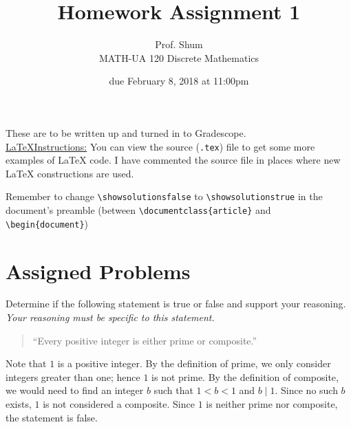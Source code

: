 \documentclass{article}
\title{Homework Assignment 1}
\author{%
    Prof. Shum
\\  MATH-UA 120 Discrete Mathematics
}
\date{due February 8, 2018 at 11:00pm}
\newif\ifshowsolutions
\newcommand{\danger}{\marginpar[\hfill\dbend]{\dbend\hfill}}
\theoremstyle{definition}
\begin{document}
\maketitle



These are to be written up and turned in to Gradescope.\\



\ifshowsolutions
    \SetupExSheets{solution/print=true}
\else
    \danger
 \underline{ \LaTeX  Instructions:}  You can view the source (\texttt{.tex}) file to get some more examples of \LaTeX{} code.  I have commented the source file in places where new \LaTeX{} constructions are used.
  
  Remember to change \verb|\showsolutionsfalse| to \verb|\showsolutionstrue|
    in the document's preamble 
    (between \verb|\documentclass{article}| and \verb|\begin{document}|)
\fi

\section*{Assigned Problems}

\begin{question}
Determine if the following statement is true or false and support your reasoning. \emph{Your reasoning must be specific to this statement.}
\begin{quote}
``Every positive integer is either prime or composite.''
\end{quote}
\end{question}
\begin{solution}
Note that $1$ is a positive integer. By the definition of prime, we only consider integers greater than one; hence $1$ is not prime. By the definition of composite, we would need to find an integer $b$ such that $1<b<1$ and $b\mid 1$. Since no such $b$ exists, $1$ is not considered a composite. Since $1$ is neither prime nor composite, the statement is false.
\end{solution}
\end{document}
